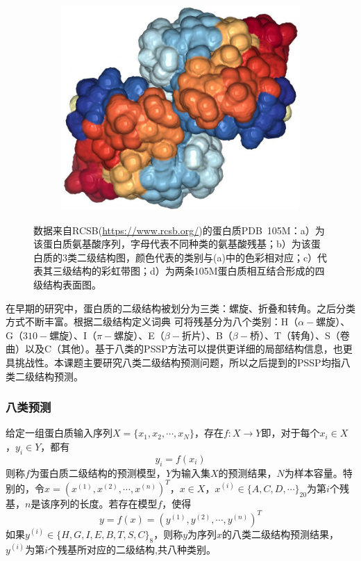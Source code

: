 \documentclass[a4paper, tikz]{article}
\begin{document}
\begin{figure}[htbp]
\begin{subfigure}{.25\textwidth}
  \caption{}
\end{subfigure}%
\begin{subfigure}{.25\textwidth}
  \centering
  \includegraphics[height=.8\linewidth]{pic/105M_fs.jpg}
  \caption{}
\end{subfigure}
\caption{
数据来自RCSB(\url{https://www.rcsb.org/})的蛋白质PDB\ 105M：a）为该蛋白质氨基酸序列，字母代表不同种类的氨基酸残基；b）为该蛋白质的3类二级结构图，颜色代表的类别与(a)中的色彩相对应；c）代表其三级结构的彩虹带图；d）为两条105M蛋白质相互结合形成的四级结构表面图。}
\label{fig:fig}
\end{figure}

在早期的研究中，蛋白质的二级结构被划分为三类：螺旋、折叠和转角。之后分类方式不断丰富。根据二级结构定义词典\citep{bulut2007dssp} 可将残基分为八个类别：H（$\alpha-$螺旋）、G（$310-$螺旋）、I（$\pi-$螺旋）、E（$\beta-$折片）、B（$\beta-$桥）、T（转角）、S（卷曲）以及C（其他）。基于八类的PSSP方法可以提供更详细的局部结构信息，也更具挑战性。本课题主要研究八类二级结构预测问题，所以之后提到的PSSP均指八类二级结构预测。

\subsubsection{八类预测}
给定一组蛋白质输入序列$X=\{x_1,x_2,\cdots,x_N\}$，存在$f:X\to Y$即，对于每个$x_i\in X$，$y_i\in Y$，都有
\begin{equation}
	y_i=f(x_i)
\end{equation}
则称$f$为蛋白质二级结构的预测模型，$Y$为输入集$X$的预测结果，$N$为样本容量。特别的，令$x=(x^{(1)},x^{(2)},\cdots,x^{(n)})^T$，$x\in X$，$x^{(i)}\in \{A,C,D,\cdots\}_{20}$为第$i$个残基，$n$是该序列的长度。若存在模型$f$，使得
\begin{equation}
	y=f(x)=(y^{(1)},y^{(2)},\cdots,y^{(n)})^T
\end{equation}
如果$y^{(i)}\in \{H,G,I,E,B,T,S,C\}_8$，则称$y$为序列$x$的八类二级结构预测结果，$y^{(i)}$为第$i$个残基所对应的二级结构,共八种类别。
\end{document}
